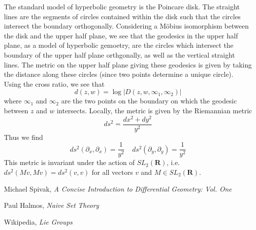 The standard model of hyperbolic geometry is the Poincare disk. The straight lines are the segments of circles contained within the disk such that the circles intersect the boundary orthogonally. Considering a M\"{o}bius isomorphism between the disk and the upper half plane, we see that the geodesics in the upper half plane, as a model of hyperbolic gemoetry, are the circles which intersect the boundary of the upper half plane orthgonally, as well as the vertical straight lines. The metric on the upper half plane giving these geodesics is given by taking the distance along these circles (since two points determine a unique circle). Using the cross ratio, we see that
%
\[ d(z,w) = \log | D(z,w,\infty_1, \infty_2) | \]
%
where $\infty_1$ and $\infty_2$ are the two points on the boundary on which the geodesic between $z$ and $w$ intersects. Locally, the metric is given by the Riemannian metric
%
\[ ds^2 = \frac{dx^2 + dy^2}{y^2} \]
%
Thus we find
%
\[ ds^2(\partial_x, \partial_x) = \frac{1}{y^2}\ \ \ \ \ ds^2(\partial_y, \partial_y) = \frac{1}{y^2}  \]
%
This metric is invariant under the action of $SL_2(\mathbf{R})$, i.e. $ds^2(Mv,Mv) = ds^2(v,v)$ for all vectors $v$ and $M \in SL_2(\mathbf{R})$.
%











\begin{thebibliography}{10}
     Michael Spivak,
    \emph{A Concise Introduction to Differential Geometry: Vol. One}

     Paul Halmos,
    \emph{Naive Set Theory}

     Wikipedia,
    \emph{Lie Groups}
\end{thebibliography}

